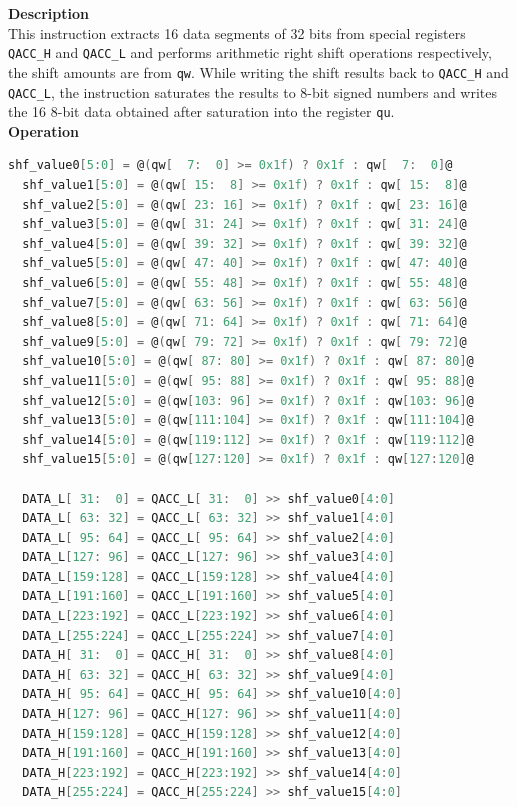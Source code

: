 \textbf{Description}\\
This instruction extracts 16 data segments of 32 bits from special registers \lstinline{QACC_H} and \lstinline{QACC_L} and performs arithmetic right shift operations respectively, the shift amounts are from \lstinline{qw}. While writing the shift results back to \lstinline{QACC_H} and \lstinline{QACC_L}, the instruction saturates the results to 8-bit signed numbers and writes the 16 8-bit data obtained after saturation into the register \lstinline{qu}.\\
\textbf{Operation}
\begin{lstlisting}[language=C, escapechar=@]
  shf_value0[5:0] = @(qw[  7:  0] >= 0x1f) ? 0x1f : qw[  7:  0]@
  shf_value1[5:0] = @(qw[ 15:  8] >= 0x1f) ? 0x1f : qw[ 15:  8]@
  shf_value2[5:0] = @(qw[ 23: 16] >= 0x1f) ? 0x1f : qw[ 23: 16]@
  shf_value3[5:0] = @(qw[ 31: 24] >= 0x1f) ? 0x1f : qw[ 31: 24]@
  shf_value4[5:0] = @(qw[ 39: 32] >= 0x1f) ? 0x1f : qw[ 39: 32]@
  shf_value5[5:0] = @(qw[ 47: 40] >= 0x1f) ? 0x1f : qw[ 47: 40]@
  shf_value6[5:0] = @(qw[ 55: 48] >= 0x1f) ? 0x1f : qw[ 55: 48]@
  shf_value7[5:0] = @(qw[ 63: 56] >= 0x1f) ? 0x1f : qw[ 63: 56]@
  shf_value8[5:0] = @(qw[ 71: 64] >= 0x1f) ? 0x1f : qw[ 71: 64]@
  shf_value9[5:0] = @(qw[ 79: 72] >= 0x1f) ? 0x1f : qw[ 79: 72]@
  shf_value10[5:0] = @(qw[ 87: 80] >= 0x1f) ? 0x1f : qw[ 87: 80]@
  shf_value11[5:0] = @(qw[ 95: 88] >= 0x1f) ? 0x1f : qw[ 95: 88]@
  shf_value12[5:0] = @(qw[103: 96] >= 0x1f) ? 0x1f : qw[103: 96]@
  shf_value13[5:0] = @(qw[111:104] >= 0x1f) ? 0x1f : qw[111:104]@
  shf_value14[5:0] = @(qw[119:112] >= 0x1f) ? 0x1f : qw[119:112]@
  shf_value15[5:0] = @(qw[127:120] >= 0x1f) ? 0x1f : qw[127:120]@

  DATA_L[ 31:  0] = QACC_L[ 31:  0] >> shf_value0[4:0]
  DATA_L[ 63: 32] = QACC_L[ 63: 32] >> shf_value1[4:0]
  DATA_L[ 95: 64] = QACC_L[ 95: 64] >> shf_value2[4:0]
  DATA_L[127: 96] = QACC_L[127: 96] >> shf_value3[4:0]
  DATA_L[159:128] = QACC_L[159:128] >> shf_value4[4:0]
  DATA_L[191:160] = QACC_L[191:160] >> shf_value5[4:0]
  DATA_L[223:192] = QACC_L[223:192] >> shf_value6[4:0]
  DATA_L[255:224] = QACC_L[255:224] >> shf_value7[4:0]
  DATA_H[ 31:  0] = QACC_H[ 31:  0] >> shf_value8[4:0]
  DATA_H[ 63: 32] = QACC_H[ 63: 32] >> shf_value9[4:0]
  DATA_H[ 95: 64] = QACC_H[ 95: 64] >> shf_value10[4:0]
  DATA_H[127: 96] = QACC_H[127: 96] >> shf_value11[4:0]
  DATA_H[159:128] = QACC_H[159:128] >> shf_value12[4:0]
  DATA_H[191:160] = QACC_H[191:160] >> shf_value13[4:0]
  DATA_H[223:192] = QACC_H[223:192] >> shf_value14[4:0]
  DATA_H[255:224] = QACC_H[255:224] >> shf_value15[4:0]



\end{lstlisting}

